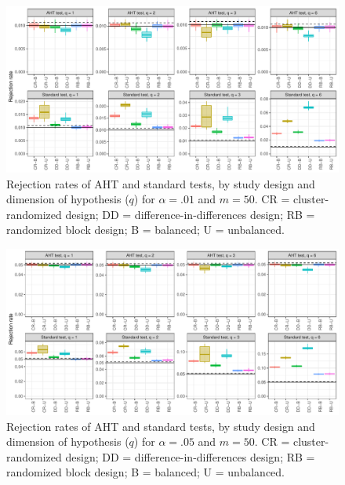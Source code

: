 \documentclass[12pt]{article}
\begin{document}
\begin{landscape}
\begin{figure}[H]
{\centering \includegraphics[width=\linewidth]{CR_fig/balance_01_50-1} 

}

\caption{Rejection rates of AHT and standard tests, by study design and dimension of hypothesis ($q$) for $\alpha = .01$ and $m = 50$. CR = cluster-randomized design; DD = difference-in-differences design; RB = randomized block design; B = balanced; U = unbalanced.}\label{fig:balance_01_50}
\end{figure}

\begin{figure}[H]

{\centering \includegraphics[width=\linewidth]{CR_fig/balance_05_50-1} 

}

\caption{Rejection rates of AHT and standard tests, by study design and dimension of hypothesis ($q$) for $\alpha = .05$ and $m = 50$. CR = cluster-randomized design; DD = difference-in-differences design; RB = randomized block design; B = balanced; U = unbalanced.}\label{fig:balance_05_50}
\end{figure}

\begin{figure}[H]


\end{figure}
\end{landscape}
\end{document}
